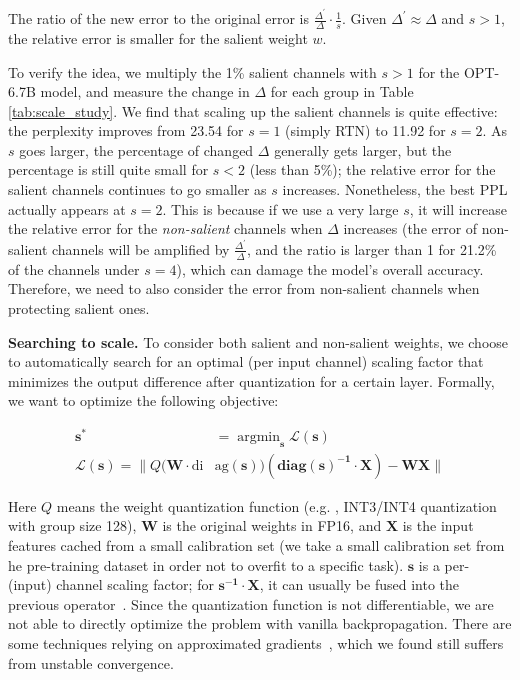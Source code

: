 The ratio of the new error to the original error is $\frac{\Delta^{'}}{\Delta} \cdot \frac{1}{s}$. Given $\Delta^{'}\approx\Delta$ and $s>1$, the relative error is smaller for the salient weight $w$. 

To verify the idea, we multiply the 1\% salient channels with $s>1$ for the OPT-6.7B model, and measure the change in $\Delta$ for each group in Table \ref{tab:scale_study}. We find that scaling up the salient channels is quite effective: the perplexity improves from 23.54 for $s=1$ (simply RTN) to 11.92 for $s=2$. As $s$ goes larger, the percentage of changed $\Delta$ generally gets larger, but the percentage is still quite small for $s<2$ (less than 5\%); the relative error for the salient channels continues to go smaller as $s$ increases. Nonetheless, the best PPL actually appears at $s=2$. This is because if we use a very large $s$, it will increase the relative error for the \emph{non-salient} channels when $\Delta$ increases (the error of non-salient channels will be amplified by $\frac{\Delta^{'}}{\Delta}$, and the ratio is larger than 1 for 21.2\% of the channels under $s=4$), which can damage the model's overall accuracy. Therefore, we need to also consider the error from non-salient channels when protecting salient ones. 

\textbf{Searching to scale. } To consider both salient and non-salient weights, we choose to automatically search for an optimal (per input channel) scaling factor that minimizes the output difference after quantization for a certain layer. Formally, we want to optimize the following objective:

\begin{equation}
\begin{aligned}
    \mathbf{s}^* &= \mathop{\arg\min}_{\mathbf{s}} \mathcal{L}(\mathbf{s}) \\  
    \mathcal{L}(\mathbf{s}) = \lVert Q(\mathbf{W}\cdot \text{di}&\text{ag}(\mathbf{s}))  (\mathbf{\text{diag}(s)^{-1}} \cdot \mathbf{X}) - \mathbf{W}\mathbf{X}  \rVert
\end{aligned}
\end{equation}

Here $Q$ means the weight quantization function (e.g. , INT3/INT4 quantization with group size 128), $\mathbf{W}$ is the original weights in FP16, and $\mathbf{X}$ is the input features cached from a small calibration set (we take a small calibration set from he pre-training dataset in order not to overfit to a specific task). $\mathbf{s}$ is a per-(input) channel scaling factor; for $\mathbf{s^{-1}} \cdot \mathbf{X}$, it can usually be fused into the previous operator~\cite{wei2022outlier, xiao2022smoothquant}. Since the quantization function is not differentiable, we are not able to directly optimize the problem with vanilla backpropagation. There are some techniques relying on approximated gradients~\cite{bengio2013estimating, esser2019learned}, which we found still suffers from unstable convergence.  

